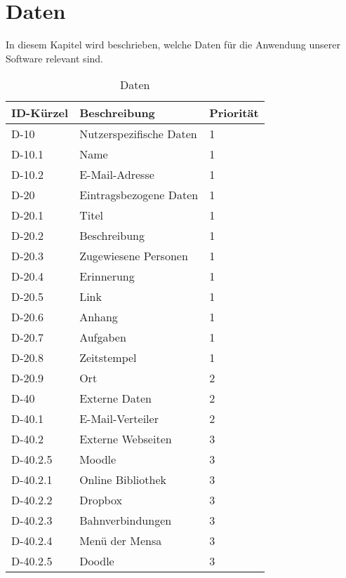 
\chapter{Daten}

In diesem Kapitel wird beschrieben, welche Daten für die Anwendung unserer Software relevant sind.\\
\begin{longtable}{|l|p{5cm}|l|}
    \toprule
    \textbf{ID-Kürzel} & \textbf{Beschreibung} & \textbf{Priorität}\\
    \hline
    \endhead
    \hline
    \caption{Daten}
    \endfoot

    D-10 & Nutzerspezifische Daten & 1\\
    D-10.1 & Name &1\\
    D-10.2 & E-Mail-Adresse &1 \\       
    \hline
    D-20 & Eintragsbezogene Daten & 1\\
    D-20.1 & Titel &1\\
    D-20.2 & Beschreibung & 1\\
    D-20.3 & Zugewiesene Personen & 1\\
    D-20.4 & Erinnerung &1\\
    D-20.5 & Link &1\\
    D-20.6 & Anhang &1\\
    D-20.7 & Aufgaben & 1\\
    D-20.8 & Zeitstempel & 1 \\
    D-20.9 & Ort &  2\\
    
    \hline
    D-40 & Externe Daten & 2\\
    D-40.1 & E-Mail-Verteiler & 2\\
    D-40.2 & Externe Webseiten & 3 \\
    D-40.2.5 & Moodle & 3\\        
    D-40.2.1 & Online Bibliothek & 3\\
    D-40.2.2 & Dropbox & 3 \\
    D-40.2.3 & Bahnverbindungen & 3\\
    D-40.2.4 & Menü der Mensa & 3\\
    D-40.2.5 & Doodle & 3\\        
    \hline
\end{longtable}


